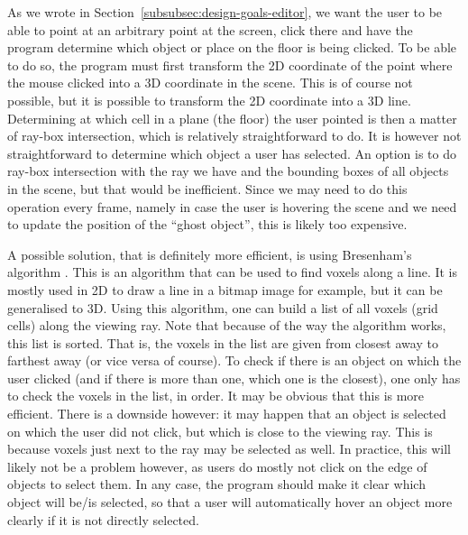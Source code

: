 As we wrote in Section~\ref{subsubsec:design-goals-editor}, we want the user to be able to point at an arbitrary point at the screen, click there and have the program determine which object or place on the floor is being clicked. To be able to do so, the program must first transform the 2D coordinate of the point where the mouse clicked into a 3D coordinate in the scene. This is of course not possible, but it is possible to transform the 2D coordinate into a 3D line. Determining at which cell in a plane (the floor) the user pointed is then a matter of ray-box intersection, which is relatively straightforward to do. It is however not straightforward to determine which object a user has selected. An option is to do ray-box intersection with the ray we have and the bounding boxes of all objects in the scene, but that would be inefficient. Since we may need to do this operation every frame, namely in case the user is hovering the scene and we need to update the position of the ``ghost object'', this is likely too expensive.

A possible solution, that is definitely more efficient, is using Bresenham's algorithm \cite{cohen1994voxel,bresenhamwiki}. This is an algorithm that can be used to find voxels along a line. It is mostly used in 2D to draw a line in a bitmap image for example, but it can be generalised to 3D. Using this algorithm, one can build a list of all voxels (grid cells) along the viewing ray. Note that because of the way the algorithm works, this list is sorted. That is, the voxels in the list are given from closest away to farthest away (or vice versa of course). To check if there is an object on which the user clicked (and if there is more than one, which one is the closest), one only has to check the voxels in the list, in order. It may be obvious that this is more efficient. There is a downside however: it may happen that an object is selected on which the user did not click, but which is close to the viewing ray. This is because voxels just next to the ray may be selected as well. In practice, this will likely  not be a problem however, as users do mostly not click on the edge of objects to select them. In any case, the program should make it clear which object will be/is selected, so that a user will automatically hover an object more clearly if it is not directly selected.